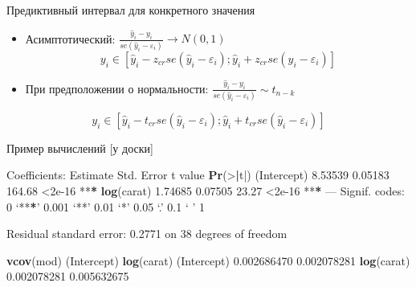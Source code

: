 \documentclass[russian,ignorenonframetext,]{beamer}
\newenvironment{Shaded}{\begin{snugshade}}{\end{snugshade}}
\newcommand{\KeywordTok}[1]{\textcolor[rgb]{0.13,0.29,0.53}{\textbf{{#1}}}}
\newcommand{\DecValTok}[1]{\textcolor[rgb]{0.00,0.00,0.81}{{#1}}}
\newcommand{\FloatTok}[1]{\textcolor[rgb]{0.00,0.00,0.81}{{#1}}}
\newcommand{\StringTok}[1]{\textcolor[rgb]{0.31,0.60,0.02}{{#1}}}
\newcommand{\ErrorTok}[1]{\textcolor[rgb]{0.64,0.00,0.00}{\textbf{{#1}}}}
\newcommand{\NormalTok}[1]{{#1}}
\begin{document}
\begin{frame}{Предиктивный интервал для конкретного значения}

\begin{itemize}
\item
  Асимптотический:
  \(\frac{\hat{y}_i - y_i }{se(\hat{y}_i-\varepsilon_i)} \to N(0,1)\) \[
  y_i  \in [\hat{y}_i - z_{cr} se(\hat{y}_i-\varepsilon_i);\hat{y}_i + z_{cr} se(\hat{y}_i-\varepsilon_i) ]
  \]
\item
  При предположении о нормальности:
  \(\frac{\hat{y}_i - y_i }{se(\hat{y}_i-\varepsilon_i)} \sim t_{n-k}\)
\end{itemize}

\[
y_i  \in [\hat{y}_i - t_{cr} se(\hat{y}_i-\varepsilon_i);\hat{y}_i + t_{cr} se(\hat{y}_i-\varepsilon_i) ]
\]

\end{frame}

\begin{frame}[fragile]{Пример вычислений {[}у доски{]}}

\begin{Shaded}
\begin{Highlighting}[]
\NormalTok{Coefficients:}
\StringTok{            }\NormalTok{Estimate Std. Error t value }\KeywordTok{Pr}\NormalTok{(>}\ErrorTok{|}\NormalTok{t|)    }
\NormalTok{(Intercept)  }\FloatTok{8.53539}    \FloatTok{0.05183}  \FloatTok{164.68}   \NormalTok{<}\FloatTok{2e-16} \NormalTok{**}\ErrorTok{*}
\KeywordTok{log}\NormalTok{(carat)   }\FloatTok{1.74685}    \FloatTok{0.07505}   \FloatTok{23.27}   \NormalTok{<}\FloatTok{2e-16} \NormalTok{**}\ErrorTok{*}
\NormalTok{---}
\NormalTok{Signif. codes:}\StringTok{  }\DecValTok{0} \NormalTok{‘**}\ErrorTok{*}\NormalTok{’ }\FloatTok{0.001} \NormalTok{‘**’ }\FloatTok{0.01} \NormalTok{‘*’ }\FloatTok{0.05} \NormalTok{‘.’ }\FloatTok{0.1} \NormalTok{‘ ’ }\DecValTok{1}

\NormalTok{Residual standard error:}\StringTok{ }\FloatTok{0.2771} \NormalTok{on }\DecValTok{38} \NormalTok{degrees of freedom}

\KeywordTok{vcov}\NormalTok{(mod)}
            \NormalTok{(Intercept)  }\KeywordTok{log}\NormalTok{(carat)}
\NormalTok{(Intercept) }\FloatTok{0.002686470} \FloatTok{0.002078281}
\KeywordTok{log}\NormalTok{(carat)  }\FloatTok{0.002078281} \FloatTok{0.005632675}
\end{Highlighting}
\end{Shaded}

\end{frame}
\end{document}
